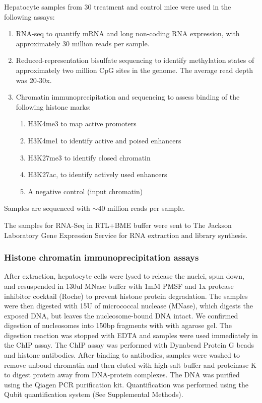 \documentclass[10pt,letterpaper]{article}
\providecommand{\tightlist}{%
  \setlength{\itemsep}{0pt}\setlength{\parskip}{0pt}}
\begin{document}
Hepatocyte samples from 30 treatment and control mice were used in the
following assays:

\begin{enumerate}
\def\labelenumi{\arabic{enumi}.}
\tightlist
\item
  RNA-seq to quantify mRNA and long non-coding RNA expression, with
  approximately 30 million reads per sample.
\item
  Reduced-representation bisulfate sequencing to identify methylation
  states of approximately two million CpG sites in the genome. The
  average read depth was 20-30x.
\item
  Chromatin immunoprecipitation and sequencing to assess binding of the
  following histone marks:

  \begin{enumerate}
  \def\labelenumii{\alph{enumii}.}
  \tightlist
  \item
    H3K4me3 to map active promoters
  \item
    H3K4me1 to identify active and poised enhancers
  \item
    H3K27me3 to identify closed chromatin
  \item
    H3K27ac, to identify actively used enhancers
  \item
    A negative control (input chromatin)
  \end{enumerate}
\end{enumerate}

Samples are sequenced with \(\sim40\) million reads per sample.

The samples for RNA-Seq in RTL+BME buffer were sent to The Jackson
Laboratory Gene Expression Service for RNA extraction and library
synthesis.

\hypertarget{histone-chromatin-immunoprecipitation-assays}{%
\subsubsection{Histone chromatin immunoprecipitation
assays}\label{histone-chromatin-immunoprecipitation-assays}}

After extraction, hepatocyte cells were lysed to release the nuclei,
spun down, and resuspended in 130ul MNase buffer with 1mM PMSF and 1x
protease inhibitor cocktail (Roche) to prevent histone protein
degradation. The samples were then digested with 15U of micrococcal
nuclease (MNase), which digests the exposed DNA, but leaves the
nucleosome-bound DNA intact. We confirmed digestion of nucleosomes into
150bp fragments with with agarose gel. The digestion reaction was
stopped with EDTA and samples were used immediately in the ChIP assay.
The ChIP assay was performed with Dynabead Protein G beads and histone
antibodies. After binding to antibodies, samples were washed to remove
unboud chromatin and then eluted with high-salt buffer and proteinase K
to digest protein away from DNA-protein complexes. The DNA was purified
using the Qiagen PCR purification kit. Quantification was performed
using the Qubit quantification system (See Supplemental Methods).
\end{document}
